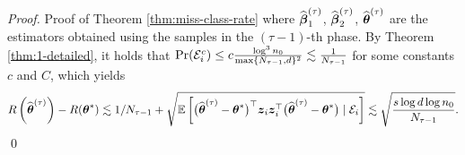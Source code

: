 \begin{proof}{Proof of Theorem \ref{thm:miss-class-rate}}
where $\widehat{\boldsymbol{\beta}}_{1}^{(\tau)}$, $\widehat{\boldsymbol{\beta}}_{2}^{(\tau)}$, $\widehat{\boldsymbol{\theta}}^{(\tau)}$ are the estimators obtained using the samples in the $(\tau-1)$-th phase.  By Theorem \ref{thm:1-detailed}, it holds that $\Pr({\cal E}_i^c) \leq c \frac{\log^3 n_0}{\max\{N_{\tau-1}, d\}^2}  \lesssim  \frac{1}{N_{\tau-1}}$ for some constants $c$ and $C$, which yields
\begin{equation*}
	R\left(\widehat{\boldsymbol{\theta}}^{(\tau)}\right)-R(\boldsymbol{\theta}^*) \lesssim 1/N_{\tau-1} + \sqrt{\mathbb{E}\left[ \big(\widehat{\boldsymbol{\theta}}^{(\tau)}-\boldsymbol{\theta}^*\big)^{\top}\boldsymbol{z}_i\boldsymbol{z}_i^{\top}\big(\widehat{\boldsymbol{\theta}}^{(\tau)}-\boldsymbol{\theta}^*\big) \;|\; {\cal E}_i \right]} \lesssim \sqrt{\frac{s\log d \log n_0}{N_{\tau-1}}}.
\end{equation*} \hfill\qed
\end{proof}

